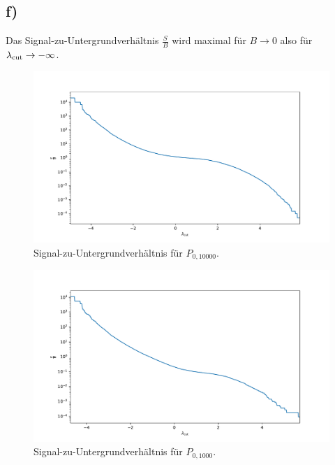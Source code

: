 \documentclass[a4paper, 11pt]{article}
\begin{document}
\subsection*{f)}
Das Signal-zu-Untergrundverhältnis $\frac{S}{B}$ wird maximal für $B \rightarrow 0$ also für $\lambda_\textup{cut} \rightarrow -\infty$.
\begin{figure}
    \centering
    \includegraphics[width=\textwidth]{../A16/A16f_10000.pdf}
    \caption{Signal-zu-Untergrundverhältnis für $P_{0, 10000}$.}
    \label{fig:A16f_10000}
\end{figure}
\begin{figure}
    \centering
    \includegraphics[width=\textwidth]{../A16/A16f_1000.pdf}
    \caption{Signal-zu-Untergrundverhältnis für $P_{0, 1000}$.}
    \label{fig:A16f_1000}
\end{figure}
\FloatBarrier
\end{document}

